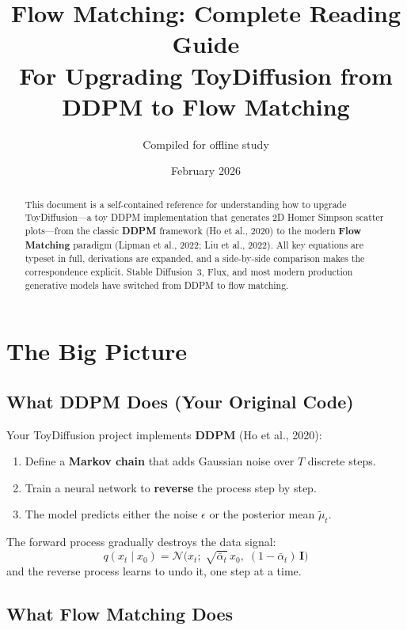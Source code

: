 \documentclass[11pt, a4paper]{article}
\title{
  \textbf{Flow Matching: Complete Reading Guide} \\[0.3em]
  \large For Upgrading ToyDiffusion from DDPM to Flow Matching
}
\author{Compiled for offline study}
\date{February 2026}
\newcommand{\mutilde}{\tilde{\mu}}
\newcommand{\alphabar}{\bar{\alpha}}
\newcommand{\N}{\mathcal{N}}
\newcommand{\Id}{\mathbf{I}}
\begin{document}
\maketitle
\thispagestyle{fancy}

\begin{abstract}
This document is a self-contained reference for understanding how to upgrade
ToyDiffusion---a toy DDPM implementation that generates 2D Homer Simpson
scatter plots---from the classic \textbf{DDPM} framework (Ho et al., 2020) to
the modern \textbf{Flow Matching} paradigm (Lipman et al., 2022; Liu et al.,
2022). All key equations are typeset in full, derivations are expanded, and a
side-by-side comparison makes the correspondence explicit. Stable Diffusion~3,
Flux, and most modern production generative models have switched from DDPM to
flow matching.
\end{abstract}

\tableofcontents
\newpage

\section{The Big Picture}
\label{sec:big-picture}

\subsection{What DDPM Does (Your Original Code)}

Your ToyDiffusion project implements \textbf{DDPM} (Ho et al., 2020):

\begin{enumerate}
  \item Define a \textbf{Markov chain} that adds Gaussian noise over $T$
        discrete steps.
  \item Train a neural network to \textbf{reverse} the process step by step.
  \item The model predicts either the noise $\epsilon$ or the posterior mean
        $\mutilde_t$.
\end{enumerate}

The forward process gradually destroys the data signal:
\[
  q(x_t \mid x_0)
  = \N\!\bigl(x_t;\; \sqrt{\alphabar_t}\, x_0,\;
    (1-\alphabar_t)\,\Id\bigr)
\]
and the reverse process learns to undo it, one step at a time.

\subsection{What Flow Matching Does}
\end{document}
